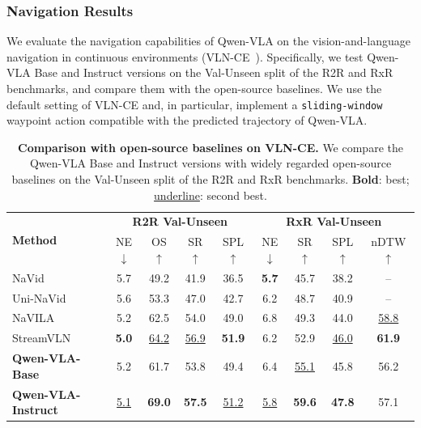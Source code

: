 \documentclass{article}
\begin{document}
\subsubsection{Navigation Results}

We evaluate the navigation capabilities of Qwen-VLA on the vision-and-language navigation in continuous environments (VLN-CE~\citep{krantz_vlnce_2020,ku2020room}). Specifically, we test Qwen-VLA Base and Instruct versions on the Val-Unseen split of the R2R and RxR benchmarks, and compare them with the open-source baselines. We use the default setting of VLN-CE and, in particular, implement a \texttt{sliding-window} waypoint action compatible with the predicted trajectory of Qwen-VLA.



\begin{table}[htbp]
  \centering
  \small
  \caption{\textbf{Comparison with open-source baselines on VLN-CE.} We compare the Qwen-VLA Base and Instruct versions with widely regarded open-source baselines on the Val-Unseen split of the R2R and RxR benchmarks. \textbf{Bold}: best; \underline{underline}: second best.}
  \label{tab:sub_vlnce}
  \setlength{\tabcolsep}{3.5pt}
  \begin{tabular}{lcccc|cccc}
    \toprule
    \multirow{2}{*}{\textbf{Method}} &
      \multicolumn{4}{c|}{\textbf{R2R Val-Unseen}} &
      \multicolumn{4}{c}{\textbf{RxR Val-Unseen}} \\
    & NE$\downarrow$ & OS$\uparrow$ & SR$\uparrow$ & SPL$\uparrow$
    & NE$\downarrow$ & SR$\uparrow$ & SPL$\uparrow$ & nDTW$\uparrow$ \\
    \midrule
    NaVid~\citep{zhang2024navid}                & 5.7 & 49.2 & 41.9 & 36.5 & \textbf{5.7} & 45.7 & 38.2 & -- \\
    Uni-NaVid~\citep{zhang2024uni}              & 5.6 & 53.3 & 47.0 & 42.7 & 6.2 & 48.7 & 40.9 & -- \\
    NaVILA~\citep{cheng2024navila}              & 5.2 & 62.5 & 54.0 & 49.0 & 6.8 & 49.3 & 44.0 & \underline{58.8} \\
    StreamVLN~\citep{wei2025streamvln}          & \textbf{5.0} & \underline{64.2} & \underline{56.9} & \textbf{51.9} & 6.2 & 52.9 & \underline{46.0} & \textbf{61.9} \\
    
    \midrule
    \textbf{Qwen-VLA-Base}                        & 5.2 & 61.7 & 53.8 & 49.4 & 6.4 & \underline{55.1} & 45.8 & 56.2 \\
    \textbf{Qwen-VLA-Instruct}                        & \underline{5.1} & \textbf{69.0} & \textbf{57.5} & \underline{51.2} & \underline{5.8} & \textbf{59.6} & \textbf{47.8} & 57.1 \\
    \bottomrule
  \end{tabular}
\end{table}
\end{document}
